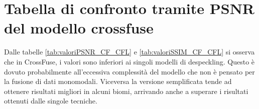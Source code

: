   \section{Tabella di confronto tramite PSNR del modello crossfuse}
  \begin{table}[H] %
    \centering
    \caption{Confronto dei modelli di despeckling e della loro fusione tramite CrossFuse tramite PSNR.}
    \label{tab:valoriPSNR_CF_CFL}
  \end{table}     
  \begin{table}[H] %
    \centering
    \caption{Confronto dei modelli di despeckling e della loro fusione tramite CrossFuse tramite SSIM.}
    \label{tab:valoriSSIM_CF_CFL}
  \end{table}     
Dalle tabelle \ref{tab:valoriPSNR_CF_CFL} e \ref{tab:valoriSSIM_CF_CFL} si osserva che in CrossFuse, i valori sono 
inferiori ai singoli modelli di despeckling. Questo è dovuto probabilmente all'eccessiva complessità del modello che non 
è pensato per la fusione di dati monomodali. Viceversa la versione semplificata tende ad ottenere risultati migliori in alcuni biomi, 
arrivando anche a superare i risultati ottenuti dalle singole tecniche. 





